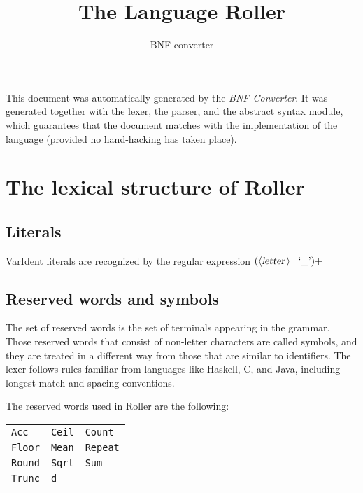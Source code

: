 \documentclass[a4paper,11pt]{article}
\author{BNF-converter}
\title{The Language Roller}
\begin{document}
\maketitle

\newcommand{\emptyP}{\mbox{$\epsilon$}}
\newcommand{\terminal}[1]{\mbox{{\texttt {#1}}}}
\newcommand{\nonterminal}[1]{\mbox{$\langle \mbox{{\sl #1 }} \! \rangle$}}
\newcommand{\arrow}{\mbox{::=}}
\newcommand{\delimit}{\mbox{$|$}}
\newcommand{\reserved}[1]{\mbox{{\texttt {#1}}}}
\newcommand{\literal}[1]{\mbox{{\texttt {#1}}}}
\newcommand{\symb}[1]{\mbox{{\texttt {#1}}}}

This document was automatically generated by the {\em BNF-Converter}. It was generated together with the lexer, the parser, and the abstract syntax module, which guarantees that the document matches with the implementation of the language (provided no hand-hacking has taken place).

\section*{The lexical structure of Roller}

\subsection*{Literals}





VarIdent literals are recognized by the regular expression
\(({\nonterminal{letter}} \mid \mbox{`\_'})+\)


\subsection*{Reserved words and symbols}
The set of reserved words is the set of terminals appearing in the grammar. Those reserved words that consist of non-letter characters are called symbols, and they are treated in a different way from those that are similar to identifiers. The lexer follows rules familiar from languages like Haskell, C, and Java, including longest match and spacing conventions.

The reserved words used in Roller are the following: \\

\begin{tabular}{lll}
{\reserved{Acc}} &{\reserved{Ceil}} &{\reserved{Count}} \\
{\reserved{Floor}} &{\reserved{Mean}} &{\reserved{Repeat}} \\
{\reserved{Round}} &{\reserved{Sqrt}} &{\reserved{Sum}} \\
{\reserved{Trunc}} &{\reserved{d}} & \\
\end{tabular}\\
\end{document}
